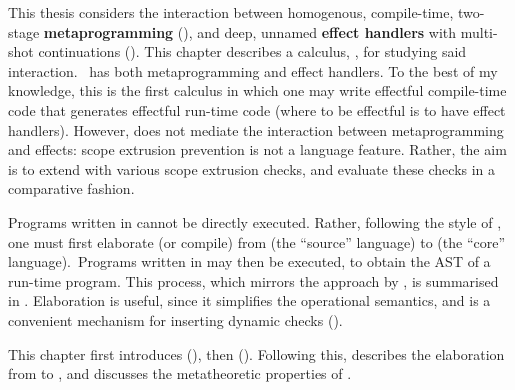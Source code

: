 This thesis considers the interaction between homogenous, compile-time, two-stage \textbf{metaprogramming} (), and deep, unnamed \textbf{effect handlers} with multi-shot continuations (). This chapter describes a calculus, \calculusName{}, for studying said interaction.\ \calculusName{} has both metaprogramming and effect handlers. To the best of my knowledge, this is the first calculus in which one may write effectful compile-time code that generates effectful run-time code (where to be effectful is to have effect handlers). However, \calculusName{} does not mediate the interaction between metaprogramming and effects: scope extrusion prevention is not a language feature. Rather, the aim is to extend \calculusName{} with various scope extrusion checks, and evaluate these checks in a comparative fashion. 

Programs written in \calculusName{} cannot be directly executed. Rather, following the style of \citet{xie-2023}, one must first elaborate (or compile) from \calculusName{} (the ``source'' language) to \coreLang{} (the ``core'' language).\, Programs written in \coreLang{} may then be executed, to obtain the AST of a run-time \efflang{} program. This process, which mirrors the approach by \citet{calcagno-2003}, is summarised in . Elaboration is useful, since it simplifies the operational semantics, and is a convenient mechanism for inserting dynamic checks (). 

This chapter first introduces \sourceLang{} (), then \coreLang{} (). Following this,  describes the elaboration from \sourceLang{} to \coreLang{}, and  discusses the metatheoretic properties of \calculusName{}. 

